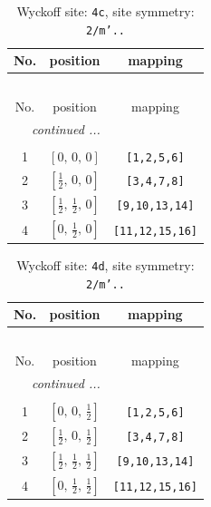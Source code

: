 \documentclass[fleqn,8pt]{jsarticle}
\begin{document}
\renewcommand{\arraystretch}{1.2}
\begin{longtable}{ccc}
\caption{Wyckoff site: {\tt 4c}, site symmetry: {\tt 2/m'..}}
 \\
 \hline \hline
No. & position & mapping \\ \hline \endfirsthead

\multicolumn{2}{l}{\tablename\ \thetable{}} \\
 \hline \hline
No. & position & mapping \\ \hline \endhead

 \hline \hline
\multicolumn{2}{r}{\footnotesize\it continued ...} \\ \endfoot

 \hline \hline
\multicolumn{2}{r}{} \\ \endlastfoot

1 & $\left[ 0,\, 0,\, 0 \right]$ & {\tt [1,2,5,6]} \\ \hline
2 & $\left[ \frac{1}{2},\, 0,\, 0 \right]$ & {\tt [3,4,7,8]} \\ \hline
3 & $\left[ \frac{1}{2},\, \frac{1}{2},\, 0 \right]$ & {\tt [9,10,13,14]} \\ \hline
4 & $\left[ 0,\, \frac{1}{2},\, 0 \right]$ & {\tt [11,12,15,16]} \\
\end{longtable}
\renewcommand{\arraystretch}{1.2}
\begin{longtable}{ccc}
\caption{Wyckoff site: {\tt 4d}, site symmetry: {\tt 2/m'..}}
 \\
 \hline \hline
No. & position & mapping \\ \hline \endfirsthead

\multicolumn{2}{l}{\tablename\ \thetable{}} \\
 \hline \hline
No. & position & mapping \\ \hline \endhead

 \hline \hline
\multicolumn{2}{r}{\footnotesize\it continued ...} \\ \endfoot

 \hline \hline
\multicolumn{2}{r}{} \\ \endlastfoot

1 & $\left[ 0,\, 0,\, \frac{1}{2} \right]$ & {\tt [1,2,5,6]} \\ \hline
2 & $\left[ \frac{1}{2},\, 0,\, \frac{1}{2} \right]$ & {\tt [3,4,7,8]} \\ \hline
3 & $\left[ \frac{1}{2},\, \frac{1}{2},\, \frac{1}{2} \right]$ & {\tt [9,10,13,14]} \\ \hline
4 & $\left[ 0,\, \frac{1}{2},\, \frac{1}{2} \right]$ & {\tt [11,12,15,16]} \\
\end{longtable}
\end{document}
